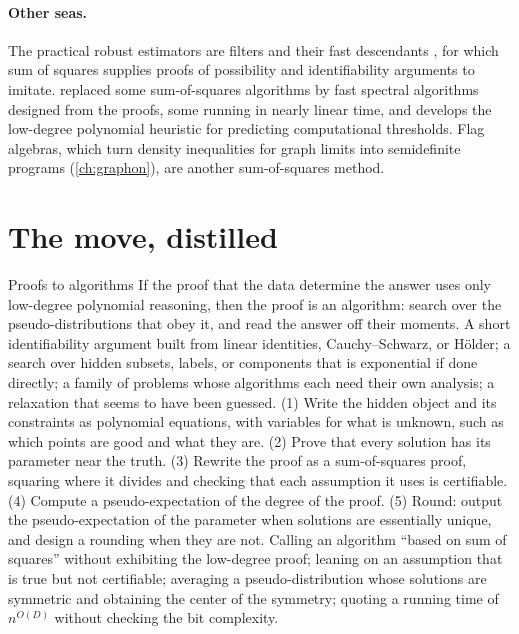 \begin{refsection}
\paragraph{Other seas.} The practical robust estimators are filters and their fast descendants \parencite{DiakonikolasKane2023}, for which sum of squares supplies proofs of possibility and identifiability arguments to imitate. \textcite{Hopkins2016} replaced some sum-of-squares algorithms by fast spectral algorithms designed from the proofs, some running in nearly linear time, and \textcite{Hopkins2018} develops the low-degree polynomial heuristic for predicting computational thresholds. Flag algebras, which turn density inequalities for graph limits into semidefinite programs (\cref{ch:graphon}), are another sum-of-squares method.

\section{The move, distilled}\label{sec:sos:distilled}

\begin{move}{Proofs to algorithms}
 If the proof that the data determine the answer uses only low-degree polynomial reasoning, then the proof is an algorithm: search over the pseudo-distributions that obey it, and read the answer off their moments.
 A short identifiability argument built from linear identities, Cauchy--Schwarz, or H\"older; a search over hidden subsets, labels, or components that is exponential if done directly; a family of problems whose algorithms each need their own analysis; a relaxation that seems to have been guessed.
 (1) Write the hidden object and its constraints as polynomial equations, with variables for what is unknown, such as which points are good and what they are. (2) Prove that every solution has its parameter near the truth. (3) Rewrite the proof as a sum-of-squares proof, squaring where it divides and checking that each assumption it uses is certifiable. (4) Compute a pseudo-expectation of the degree of the proof. (5) Round: output the pseudo-expectation of the parameter when solutions are essentially unique, and design a rounding when they are not.
 Calling an algorithm ``based on sum of squares'' without exhibiting the low-degree proof; leaning on an assumption that is true but not certifiable; averaging a pseudo-distribution whose solutions are symmetric and obtaining the center of the symmetry; quoting a running time of $n^{O(D)}$ without checking the bit complexity.
\end{move}


\end{refsection}
